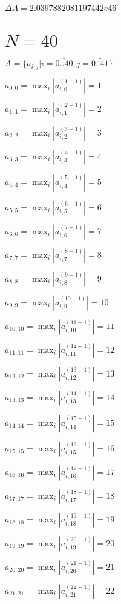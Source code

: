 \documentclass[a4paper,12pt]{article}
\begin{document}
$\Delta A = 2.0397882081197442e46$



\section{ $N = 40$ }
$A = \{ a _{ i, j } | i = \bar { 0..40 }, j = \bar { 0..41 } \}$

$a _{ 0, 0 } =  \max _i |a _{ i, 0 } ^{ (1 - 1) } | = 1$

$a _{ 1, 1 } =  \max _i |a _{ i, 1 } ^{ (2 - 1) } | = 2$

$a _{ 2, 2 } =  \max _i |a _{ i, 2 } ^{ (3 - 1) } | = 3$

$a _{ 3, 3 } =  \max _i |a _{ i, 3 } ^{ (4 - 1) } | = 4$

$a _{ 4, 4 } =  \max _i |a _{ i, 4 } ^{ (5 - 1) } | = 5$

$a _{ 5, 5 } =  \max _i |a _{ i, 5 } ^{ (6 - 1) } | = 6$

$a _{ 6, 6 } =  \max _i |a _{ i, 6 } ^{ (7 - 1) } | = 7$

$a _{ 7, 7 } =  \max _i |a _{ i, 7 } ^{ (8 - 1) } | = 8$

$a _{ 8, 8 } =  \max _i |a _{ i, 8 } ^{ (9 - 1) } | = 9$

$a _{ 9, 9 } =  \max _i |a _{ i, 9 } ^{ (10 - 1) } | = 10$

$a _{ 10, 10 } =  \max _i |a _{ i, 10 } ^{ (11 - 1) } | = 11$

$a _{ 11, 11 } =  \max _i |a _{ i, 11 } ^{ (12 - 1) } | = 12$

$a _{ 12, 12 } =  \max _i |a _{ i, 12 } ^{ (13 - 1) } | = 13$

$a _{ 13, 13 } =  \max _i |a _{ i, 13 } ^{ (14 - 1) } | = 14$

$a _{ 14, 14 } =  \max _i |a _{ i, 14 } ^{ (15 - 1) } | = 15$

$a _{ 15, 15 } =  \max _i |a _{ i, 15 } ^{ (16 - 1) } | = 16$

$a _{ 16, 16 } =  \max _i |a _{ i, 16 } ^{ (17 - 1) } | = 17$

$a _{ 17, 17 } =  \max _i |a _{ i, 17 } ^{ (18 - 1) } | = 18$

$a _{ 18, 18 } =  \max _i |a _{ i, 18 } ^{ (19 - 1) } | = 19$

$a _{ 19, 19 } =  \max _i |a _{ i, 19 } ^{ (20 - 1) } | = 20$

$a _{ 20, 20 } =  \max _i |a _{ i, 20 } ^{ (21 - 1) } | = 21$

$a _{ 21, 21 } =  \max _i |a _{ i, 21 } ^{ (22 - 1) } | = 22$
\end{document}
